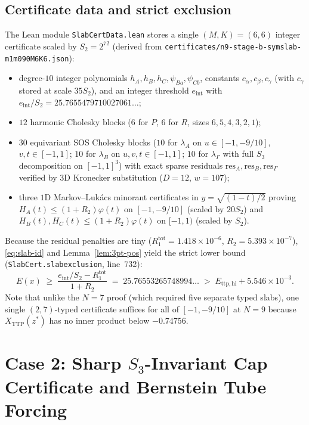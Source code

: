 \documentclass[11pt,reqno]{amsart}
\renewcommand{\_}{\origunderscore\allowbreak}
\theoremstyle{definition}
\newcommand{\TTP}{X_{\mathrm{TTP}}}
\newcommand{\Ettphi}{E_{\mathrm{ttp,hi}}}
\begin{document}
\subsection{Certificate data and strict exclusion}\label{subsec:slab-cert}
The Lean module \texttt{SlabCertData.lean} stores a single $(M,K) = (6,6)$ integer certificate scaled by $S_2 = 2^{72}$ (derived from \texttt{certificates/n9-stage-b-symslab-m1\_m090\_M6K6.json}):
\begin{itemize}[leftmargin=2em]
  \item degree-$10$ integer polynomials $h_A, h_B, h_C, \psi_{Ba}, \psi_{Cb}$, constants $c_\alpha, c_\beta, c_\gamma$ (with $c_\gamma$ stored at scale $35 S_2$), and an integer threshold $e_{\mathrm{int}}$ with $e_{\mathrm{int}}/S_2 = 25.7655479710027061\ldots$;
  \item $12$ harmonic Cholesky blocks ($6$ for $P$, $6$ for $R$, sizes $6,5,4,3,2,1$);
  \item $30$ equivariant SOS Cholesky blocks ($10$ for $\lambda_A$ on $u \in [-1,-9/10]$, $v,t \in [-1,1]$; $10$ for $\lambda_B$ on $u,v,t \in [-1,1]$; $10$ for $\lambda_\Gamma$ with full $S_3$ decomposition on $[-1,1]^3$) with exact sparse residuals $\mathrm{res}_A, \mathrm{res}_B, \mathrm{res}_\Gamma$ verified by $3\text{D}$ Kronecker substitution ($D=12$, $w=107$);
  \item three $1\text{D}$ Markov--Luk\'acs minorant certificates in $y = \sqrt{(1-t)/2}$ proving $H_A(t) \le (1+R_2)\varphi(t)$ on $[-1,-9/10]$ (scaled by $20 S_2$) and $H_B(t), H_C(t) \le (1+R_2)\varphi(t)$ on $[-1,1)$ (scaled by $S_2$).
\end{itemize}
Because the residual penalties are tiny ($R_1^{\mathrm{tot}} = 1.418 \times 10^{-6}$, $R_2 = 5.393 \times 10^{-7}$), \eqref{eq:slab-id} and Lemma~\ref{lem:3pt-pos} yield the strict lower bound (\texttt{SlabCert.slab\_exclusion}, line~732):
\[
  E(x) \;\ge\; \frac{e_{\mathrm{int}}/S_2 - R_1^{\mathrm{tot}}}{1 + R_2}
  \;=\; 25.76553265748994\ldots \;>\; \Ettphi + 5.546 \times 10^{-3}.
\]
Note that unlike the $N=7$ proof (which required five separate typed slabs), one single $(2,7)$-typed certificate suffices for all of $[-1, -9/10]$ at $N=9$ because $\TTP(z^*)$ has no inner product below $-0.74756$.

\section{Case 2: Sharp $S_3$-Invariant Cap Certificate and Bernstein Tube Forcing}\label{sec:cap}
\end{document}
